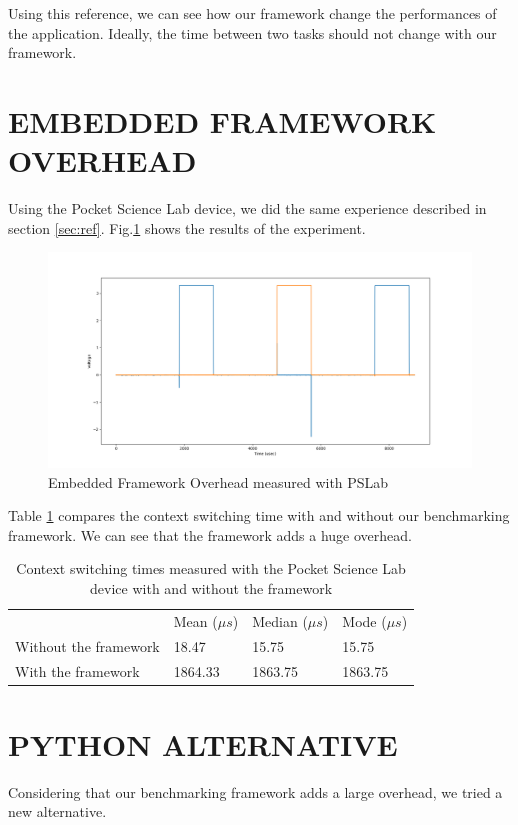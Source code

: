 \documentclass[a4paper, 10pt, conference]{ieeeconf}      %
\begin{document}
Using this reference, we can see how our framework change the performances of the application.
Ideally, the time between two tasks should not change with our framework.

\section{EMBEDDED FRAMEWORK OVERHEAD}

Using the Pocket Science Lab device, we did the same experience described in section \ref{sec:ref}.
Fig.\ref{fig:framework_overhead} shows the results of the experiment.

\begin{figure}[!h]
    \centering
    \includegraphics[scale=0.2]{framework_overhead.png}
    \caption{Embedded Framework Overhead measured with PSLab}
    \label{fig:framework_overhead}
\end{figure}

Table \ref{table:context_switching_times} compares the context switching time with and without our benchmarking framework.
We can see that the framework adds a huge overhead.


\begin{table}[!h]
    \centering
    \caption{Context switching times measured with the Pocket Science Lab device with and without the framework}
    \begin{tabular}{llll}
        \cline{2-4}
        & Mean ($\mu s$) & Median ($\mu s$) & Mode ($\mu s$) \\ \cline{2-4}
        Without the framework & 18.47 & 15.75 & 15.75 \\
        With the framework & 1864.33 & 1863.75 & 1863.75
    \end{tabular}
    \label{table:context_switching_times}
\end{table}

\section{PYTHON ALTERNATIVE}
Considering that our benchmarking framework adds a large overhead, we tried a new alternative.
\end{document}
